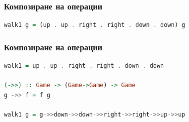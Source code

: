 \documentclass{beamer}
\begin{document}
\begin{frame}[fragile]
  \frametitle{Композиране на операции}

\begin{lstlisting}[language=Haskell]
walk1 g = (up . up . right . right . down . down) g
\end{lstlisting}



\end{frame}


\begin{frame}[fragile]
  \frametitle{Композиране на операции}

\bigskip
\bigskip
\bigskip
\bigskip
\bigskip

\begin{lstlisting}[language=Haskell]
walk1 = up . up . right . right . down . down

(->>) :: Game -> (Game->Game) -> Game
g ->> f = f g

walk1 g = g->>down->>down->>right->>right->>up->>up
\end{lstlisting}


\end{frame}
\end{document}
